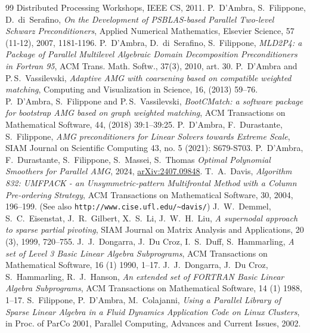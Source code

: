 \begin{thebibliography}{99}
Distributed Processing Workshops, IEEE CS, 2011.
%
%
P.~D'Ambra, S.~Filippone,  D.~di~Serafino,
{\em On the Development of PSBLAS-based Parallel Two-level Schwarz Preconditioners},
Applied Numerical Mathematics, Elsevier Science,
57 (11-12), 2007, 1181-1196.
%
P.~D'Ambra, D.~di~Serafino, S.~Filippone,
\emph{MLD2P4: a Package of Parallel Multilevel
Algebraic Domain Decomposition Preconditioners
in Fortran 95},  ACM Trans. Math. Softw., 37(3), 2010, art. 30.
%
P.~D'Ambra and P.\,S.~Vassilevski,
{\em Adaptive AMG with coarsening based on compatible weighted matching},
Computing and Visualization in Science, 16, (2013) 59--76.
%
P.~D'Ambra, S.~Filippone and P.\,S.~Vassilevski,
{\em BootCMatch: a software package for bootstrap AMG based on graph weighted matching},
ACM Transactions on Mathematical Software, 44, (2018) 39:1--39:25.
%
P.~D'Ambra, F.~Durastante, S.~Filippone, 
\emph{AMG preconditioners for Linear Solvers towards Extreme Scale}, 
SIAM Journal on Scientific Computing 43, no. 5 (2021): S679-S703.
%
P.~D'Ambra, F.~Durastante, S.~Filippone, S.~Massei, S.~Thomas
\emph{Optimal Polynomial Smoothers for Parallel AMG}, 2024,
\href{https://arxiv.org/abs/2407.09848}{arXiv:2407.09848}.
%
T.~A.~Davis,
{\em Algorithm 832: UMFPACK - an Unsymmetric-pattern Multifrontal
Method with a Column Pre-ordering Strategy},
ACM Transactions on Mathematical Software, 30, 2004, 196--199.
(See also \texttt{http://www.cise.ufl.edu/{\textasciitilde}davis/})
%
J.~W.~Demmel, S.~C.~Eisenstat, J.~R.~Gilbert, X.~S.~Li, J.~W.~H.~Liu,
{\em A supernodal approach to sparse partial pivoting},
SIAM Journal on Matrix Analysis and Applications, 20 (3), 1999, 720--755.
%
J.~J.~Dongarra, J.~Du Croz, I.~S.~Duff, S.~Hammarling,
\emph{A set of Level 3 Basic Linear Algebra Subprograms},
ACM Transactions on Mathematical Software, 16 (1) 1990, 1--17.
%
J.~J.~Dongarra, J.~Du Croz, S.~Hammarling, R.~J.~Hanson,
\emph{An extended set of FORTRAN Basic Linear Algebra Subprograms},
ACM Transactions on Mathematical Software, 14 (1) 1988, 1--17.
%
%
%
S.~Filippone, P.~D'Ambra, M.~Colajanni,
{\em Using a Parallel Library of Sparse Linear Algebra in a Fluid Dynamics Application Code on Linux Clusters},
in Proc. of ParCo 2001, Parallel Computing, Advances and Current Issues, 2002.


\end{thebibliography}
